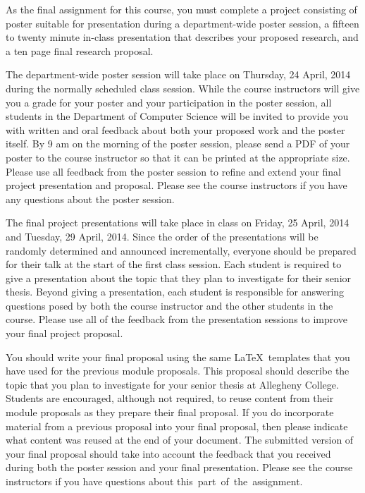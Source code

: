 
\usepackage{ulem}
\usepackage[compact]{titlesec}




As the final assignment for this course, you must complete a project consisting of poster suitable for presentation
during a department-wide poster session, a fifteen to twenty minute in-class presentation that describes your proposed
research, and a ten page final research proposal.

The department-wide poster session will take place on Thursday, 24 April, 2014 during the normally scheduled class
session.  While the course instructors will give you a grade for your poster and your participation in the poster
session, all students in the Department of Computer Science will be invited to provide you with written and oral
feedback about both your proposed work and the poster itself.  By 9 am on the morning of the poster session, please send
a PDF of your poster to the course instructor so that it can be printed at the appropriate size.  Please use all
feedback from the poster session to refine and extend your final project presentation and proposal. Please see the
course instructors if you have any questions about the poster session.

The final project presentations will take place in class on Friday, 25 April, 2014 and Tuesday, 29 April, 2014. Since
the order of the presentations will be randomly determined and announced incrementally, everyone should be prepared for
their talk at the start of  the first class session. Each student is required to give a presentation about the topic
that they plan to investigate for their senior thesis.  Beyond giving a presentation, each student is responsible for
answering questions posed by both the course instructor and the other students in the course. Please use all of the
feedback from the presentation sessions to improve your final project proposal.

You should write your final proposal using the same \LaTeX\ templates that you have used for the previous module
proposals. This proposal should describe the topic that you plan to investigate for your senior thesis at Allegheny
College. Students are encouraged, although not required, to reuse content from their module proposals as they prepare
their final proposal. If you do incorporate material from a previous proposal into your final proposal, then please
indicate what content was reused at the end of your document. The submitted version of your final proposal should take
into account the feedback that you received during both the poster session and your final presentation. Please see the
course instructors if you have questions about \mbox{this part of the assignment}.


